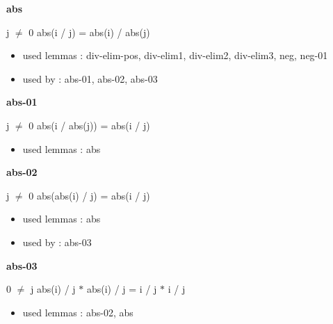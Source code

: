\documentclass[a4paper]{article}
\begin{document}
\raggedright
              
\bigskip

{\large\bf abs}

\medskip

j $\neq$ 0 \Fol abs(i / j) = abs(i) / abs(j)

\begin{itemize}


\item       used lemmas  : div-elim-pos, div-elim1, div-elim2, div-elim3, neg, neg-01
\item       used by      : abs-01, abs-02, abs-03

\end{itemize}

\medskip

\bigskip

{\large\bf abs-01}

\medskip

j $\neq$ 0 \Fol abs(i / abs(j)) = abs(i / j)

\begin{itemize}


\item       used lemmas  : abs

\end{itemize}

\medskip

\bigskip

{\large\bf abs-02}

\medskip

j $\neq$ 0 \Fol abs(abs(i) / j) = abs(i / j)

\begin{itemize}


\item       used lemmas  : abs
\item       used by      : abs-03

\end{itemize}

\medskip

\bigskip

{\large\bf abs-03}

\medskip

0 $\neq$ j \Fol abs(i) / j $*$ abs(i) / j = i / j $*$ i / j

\begin{itemize}


\item       used lemmas  : abs-02, abs

\end{itemize}
\end{document}
